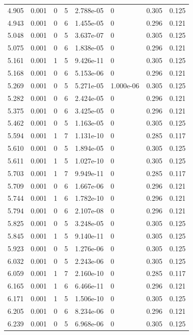 \documentclass[preview]{standalone}
\begin{document}
{{{\begin{tabular}{L{1.2cm}C{1.2cm} C{0.3cm}C{0.5cm} C{1.4cm}C{1.4cm} C{1.4cm}C{1.4cm}}
  4.905  &  0.001  & 0     &  5 &  2.788e-05  & 0  & 0.305 &  0.125   \\ 
  4.943  &  0.001  & 0     &  6 &  1.455e-05  & 0  & 0.296 &  0.121   \\ 
  5.048  &  0.001  & 0     &  5 &  3.637e-07  & 0  & 0.305 &  0.125   \\ 
  5.075  &  0.001  & 0     &  6 &  1.838e-05  & 0  & 0.296 &  0.121   \\ 
  5.161  &  0.001  & 1     &  5 &  9.426e-11  & 0  & 0.305 &  0.125   \\ 
  5.168  &  0.001  & 0     &  6 &  5.153e-06  & 0  & 0.296 &  0.121   \\ 
  5.269  &  0.001  & 0     &  5 &  5.271e-05  & 1.000e-06  & 0.305 &  0.125   \\ 
  5.282  &  0.001  & 0     &  6 &  2.424e-05  & 0  & 0.296 &  0.121   \\ 
  5.375  &  0.001  & 0     &  6 &  3.425e-05  & 0  & 0.296 &  0.121   \\ 
  5.462  &  0.001  & 0     &  5 &  1.163e-05  & 0  & 0.305 &  0.125   \\ 
  5.594  &  0.001  & 1     &  7 &  1.131e-10  & 0  & 0.285 &  0.117   \\ 
  5.610  &  0.001  & 0     &  5 &  1.894e-05  & 0  & 0.305 &  0.125   \\ 
  5.611  &  0.001  & 1     &  5 &  1.027e-10  & 0  & 0.305 &  0.125   \\ 
  5.703  &  0.001  & 1     &  7 &  9.949e-11  & 0  & 0.285 &  0.117   \\ 
  5.709  &  0.001  & 0     &  6 &  1.667e-06  & 0  & 0.296 &  0.121   \\ 
  5.744  &  0.001  & 1     &  6 &  1.782e-10  & 0  & 0.296 &  0.121   \\ 
  5.794  &  0.001  & 0     &  6 &  2.107e-08  & 0  & 0.296 &  0.121   \\ 
  5.825  &  0.001  & 0     &  5 &  3.248e-05  & 0  & 0.305 &  0.125   \\ 
  5.845  &  0.001  & 1     &  5 &  9.140e-11  & 0  & 0.305 &  0.125   \\ 
  5.923  &  0.001  & 0     &  5 &  1.276e-06  & 0  & 0.305 &  0.125   \\ 
  6.032  &  0.001  & 0     &  5 &  2.243e-06  & 0  & 0.305 &  0.125   \\ 
  6.059  &  0.001  & 1     &  7 &  2.160e-10  & 0  & 0.285 &  0.117   \\ 
  6.165  &  0.001  & 1     &  6 &  6.466e-11  & 0  & 0.296 &  0.121   \\ 
  6.171  &  0.001  & 1     &  5 &  1.506e-10  & 0  & 0.305 &  0.125   \\ 
  6.205  &  0.001  & 0     &  6 &  8.234e-06  & 0  & 0.296 &  0.121   \\ 
  6.239  &  0.001  & 0     &  5 &  6.968e-06  & 0  & 0.305 &  0.125   \\ 
\hline 
\end{tabular} 

}}}
\end{document}

